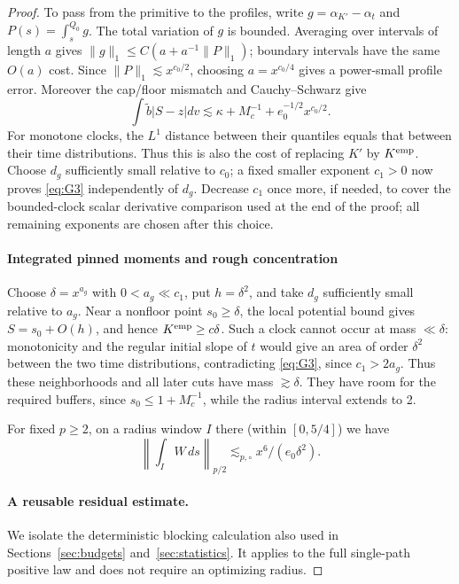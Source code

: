 \begin{proof}
To pass from the primitive to the profiles, write
\(g=\alpha_{K'}-\alpha_t\) and \(P(s)=\int_s^{Q_0}g\).
The total variation of \(g\) is bounded. Averaging over intervals
of length \(a\) gives
\(\|g\|_1\le C(a+a^{-1}\|P\|_1)\); boundary intervals have
the same \(O(a)\) cost. Since \(\|P\|_1\lesssim x^{c_0/2}\),
choosing \(a=x^{c_0/4}\) gives a power-small profile error.
Moreover the cap/floor mismatch and Cauchy--Schwarz give
\[
 \int\widetilde b|S-z|dv
 \lesssim\kappa+M_c^{-1}+e_0^{-1/2}x^{c_0/2}.
\]
For monotone clocks, the \(L^1\) distance between their quantiles
equals that between their time distributions. Thus this is also the
cost of replacing \(K'\) by \(K^{\rm emp}\). Choose \(d_g\)
sufficiently small relative to \(c_0\); a fixed smaller exponent
\(c_1>0\) now proves \eqref{eq:G3} independently of \(d_g\).
Decrease \(c_1\) once more, if needed, to cover the bounded-clock
scalar derivative comparison used at the end of the proof; all
remaining exponents are chosen after this choice.

\paragraph{Integrated pinned moments and rough concentration}
Choose \(\delta=x^{a_g}\) with \(0<a_g\ll c_1\), put
\(h=\delta^2\), and take \(d_g\) sufficiently small relative to
\(a_g\). Near a nonfloor point \(s_0\ge\delta\), the local
potential bound gives \(S=s_0+O(h)\), and hence
\(K^{\rm emp}\ge c\delta\). Such a clock cannot occur at mass
\(\ll\delta\): monotonicity and the regular initial slope of \(t\)
would give an area of order \(\delta^2\) between the two time
distributions, contradicting \eqref{eq:G3}, since \(c_1>2a_g\).
Thus these neighborhoods and all later cuts have mass
\(\gtrsim\delta\). They have room for the required buffers, since
\(s_0\le1+M_c^{-1}\), while the radius interval extends to 2.

For fixed \(p\ge2\), on a radius window \(I\) there (within \([0,5/4]\)) we have
\[
 \left\|\int_I W\,ds\right\|_{p/2}\lesssim_{p,\circ} x^6/(e_0\delta^2).   \tag{G4}\label{eq:G4}
\]
\paragraph{A reusable residual estimate.}
\label{par:global-block-estimates}
We isolate the deterministic blocking calculation also used in
Sections~\ref{sec:budgets} and~\ref{sec:statistics}. It applies to the full single-path
positive law and does not require an optimizing radius.


\end{proof}
